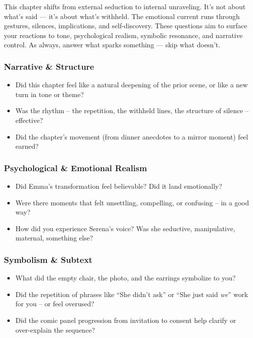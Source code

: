 This chapter shifts from external seduction to internal unraveling. It’s not about what’s said — it’s about what’s withheld. The emotional current runs through gestures, silences, implications, and self-discovery. These questions aim to surface your reactions to tone, psychological realism, symbolic resonance, and narrative control. As always, answer what sparks something — skip what doesn’t.

\subsubsection{Narrative \& Structure}

\begin{itemize}
  \item Did this chapter feel like a natural deepening of the prior scene, or like a new turn in tone or theme?
  \item Was the rhythm -- the repetition, the withheld lines, the structure of silence -- effective?
  \item Did the chapter’s movement (from dinner anecdotes to a mirror moment) feel earned?
\end{itemize}

\subsubsection{Psychological \& Emotional Realism}

\begin{itemize}
  \item Did Emma’s transformation feel believable? Did it land emotionally?
  \item Were there moments that felt unsettling, compelling, or confusing -- in a good way?
  \item How did you experience Serena’s voice? Was she seductive, manipulative, maternal, something else?
\end{itemize}

\subsubsection{Symbolism \& Subtext}

\begin{itemize}
  \item What did the empty chair, the photo, and the earrings symbolize to you?
  \item Did the repetition of phrases like ``She didn’t ask'' or ``She just said \textit{we}'' work for you -- or feel overused?
  \item Did the comic panel progression from invitation to consent help clarify or over-explain the sequence?
\end{itemize}

